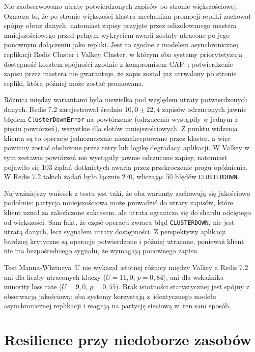 Nie zaobserwowano utraty potwierdzonych zapisów po stronie większościowej. Oznacza to, że po stronie większości klastra mechanizm promocji repliki zachował spójny obraz danych, natomiast zapisy przyjęte przez odizolowanego mastera mniejszościowego przed pełnym wykryciem awarii zostały utracone po jego ponownym dołączeniu jako repliki. Jest to zgodne z modelem asynchronicznej replikacji Redis Cluster i Valkey Cluster, w którym oba systemy priorytetyzują dostępność kosztem spójności zgodnie z kompromisem CAP~\cite{brewer2012}: potwierdzenie zapisu przez mastera nie gwarantuje, że zapis został już utrwalony po stronie repliki, która później może zostać promowana.

Różnica między wariantami była niewielka pod względem utraty potwierdzonych danych. Redis 7.2 zarejestrował średnio $10{,}0 \pm 22{,}4$ zapisów odrzuconych jawnie błędem \texttt{ClusterDownError} na powtórzenie (odrzucenia wystąpiły w jednym z pięciu powtórzeń), wszystkie dla slotów mniejszościowych. Z punktu widzenia klienta są to operacje jednoznacznie niezaakceptowane przez klaster, a więc powinny zostać obsłużone przez retry lub logikę degradacji aplikacji. W Valkey w tym zestawie powtórzeń nie wystąpiły jawnie odrzucone zapisy, natomiast pojawiło się 103 żądań dotkniętych awarią przez przekroczenie progu opóźnienia. W Redis 7.2 takich żądań było łącznie 270, wliczając 50 błędów \texttt{CLUSTERDOWN}.

Najważniejszy wniosek z testu jest taki, że oba warianty zachowują się jakościowo podobnie: partycja mniejszościowa może prowadzić do utraty zapisów, które klient uznał za zakończone sukcesem, ale utrata ogranicza się do shardu odciętego od większości. Sam fakt, że część operacji zwraca błąd \texttt{CLUSTERDOWN}, nie jest utratą danych, lecz sygnałem utraty dostępności. Z perspektywy aplikacji bardziej krytyczne są operacje potwierdzone i później utracone, ponieważ klient nie ma bezpośredniego sygnału, że wymagają ponownego zapisu.

Test Manna-Whitneya~U nie wykazał istotnej różnicy między Valkey a Redis 7.2 ani dla liczby utraconych kluczy ($U = 11{,}0$, $p = 0{,}84$), ani dla wskaźnika minority loss rate ($U = 9{,}0$, $p = 0{,}55$). Brak istotności statystycznej jest spójny z obserwacją jakościową: oba systemy korzystają z~identycznego modelu asynchronicznej replikacji i reagują na partycję sieciową w~ten sam sposób.

\section{Resilience przy niedoborze zasobów}


